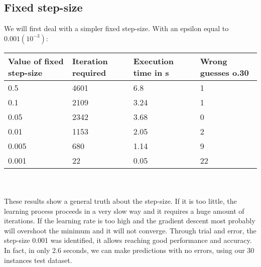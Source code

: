 \documentclass[a4paper,11pt,oneside]{book}
\begin{document}
\subsection{Fixed step-size} \label{Subsec2.2.4}
 We will first deal with a simpler fixed step-size. With an epsilon equal to $0.001 (10^{-3})$:\\
\begin{tabularx}{\textwidth}{|X|X|X|X|}
\hline
\textbf{Value of fixed step-size} & \textbf{Iteration required} & \textbf{Execution time in s} & \textbf{Wrong guesses o.30}\\
\hline
0.5 & 4601 & 6.8 & 1\\
\hline
0.1 & 2109 & 3.24 & 1\\
\hline
0.05 & 2342 & 3.68 & 0\\
\hline
0.01 & 1153 & 2.05 & 2\\
\hline
0.005 & 680 & 1.14 & 9\\
\hline
0.001 & 22 & 0.05 & 22\\
\hline
\end{tabularx}
\\ \\
These results show a general truth about the step-size. If it is too little, the learning process proceeds in a very slow way and it requires a huge amount of iterations. If the learning rate is too high and the gradient descent most probably will overshoot the minimum and it will not converge. Through trial and error, the step-size 0.001 was identified, it allows reaching good performance and accuracy. In fact, in only 2.6 seconds, we can make predictions with no errors, using our 30 instances test dataset.
\end{document}
